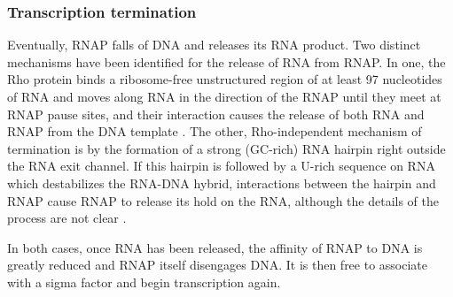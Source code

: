 \subsubsection{Transcription termination}
Eventually, RNAP falls of DNA and releases its RNA product. Two distinct
mechanisms have been identified for the release of RNA from RNAP. In one, the Rho
protein binds a ribosome-free unstructured region of at least 97 nucleotides of
RNA and moves along RNA in the direction of the RNAP until they meet at RNAP
pause sites, and their interaction causes the release of both RNA and RNAP from
the DNA template \cite{ciampi_rho-dependent_2006}. The other, Rho-independent
mechanism of termination is by the formation of a strong (GC-rich) RNA hairpin
right outside the RNA exit channel. If this hairpin is followed by a U-rich
sequence on RNA which destabilizes the RNA-DNA hybrid, interactions between the
hairpin and RNAP cause RNAP to release its hold on the RNA, although the
details of the process are not clear \cite{nudler_transcription_2002}.

In both cases, once RNA has been released, the affinity of RNAP to DNA is
greatly reduced and RNAP itself disengages DNA. It is then free to associate
with a sigma factor and begin transcription again.
